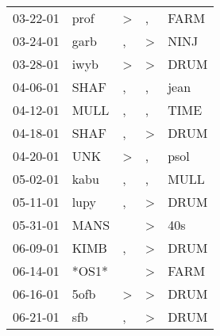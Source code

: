 \begin{supertabular}{p{0.07\textwidth}p{0.06\textwidth}p{0.02\textwidth}p{0.02\textwidth}p{0.06\textwidth}}
          03-22-01\textsuperscript{} &           prof\textsuperscript{} &     \textgreater &                , &           FARM\textsuperscript{} \\
          03-24-01\textsuperscript{} &           garb\textsuperscript{} &                , &     \textgreater &           NINJ\textsuperscript{} \\
          03-28-01\textsuperscript{} &           iwyb\textsuperscript{} &     \textgreater &     \textgreater &           DRUM\textsuperscript{} \\
          04-06-01\textsuperscript{} &           SHAF\textsuperscript{} &                , &                , &           jean\textsuperscript{} \\
          04-12-01\textsuperscript{} &           MULL\textsuperscript{} &                , &                , &           TIME\textsuperscript{} \\
          04-18-01\textsuperscript{} &           SHAF\textsuperscript{} &                , &     \textgreater &           DRUM\textsuperscript{} \\
          04-20-01\textsuperscript{} &            UNK\textsuperscript{} &     \textgreater &                , &           psol\textsuperscript{} \\
          05-02-01\textsuperscript{} &           kabu\textsuperscript{} &                , &                , &           MULL\textsuperscript{} \\
          05-11-01\textsuperscript{} &           lupy\textsuperscript{} &                , &     \textgreater &           DRUM\textsuperscript{} \\
          05-31-01\textsuperscript{} &           MANS\textsuperscript{} &                  &     \textgreater &            40s\textsuperscript{} \\
          06-09-01\textsuperscript{} &           KIMB\textsuperscript{} &                , &     \textgreater &           DRUM\textsuperscript{} \\
          06-14-01\textsuperscript{} &                            *OS1* &                  &     \textgreater &           FARM\textsuperscript{} \\
          06-16-01\textsuperscript{} &           5ofb\textsuperscript{} &     \textgreater &     \textgreater &           DRUM\textsuperscript{} \\
          06-21-01\textsuperscript{} &            sfb\textsuperscript{} &                , &     \textgreater &           DRUM\textsuperscript{} \\

\end{supertabular}

